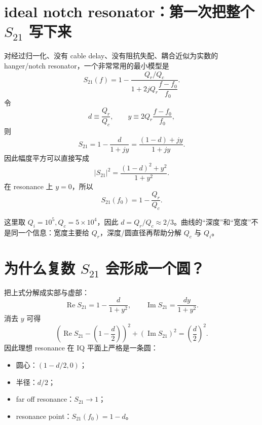 \documentclass[11pt,a4paper,openany]{ctexrep}
\begin{document}
\section{ideal notch resonator：第一次把整个 $S_{21}$ 写下来}

对经过归一化、没有 cable delay、没有阻抗失配、耦合近似为实数的 hanger/notch resonator，一个非常常用的最小模型是
\[
\boxed{
S_{21}(f)
=1-
\frac{Q_r/Q_c}
{1+2jQ_r\dfrac{f-f_0}{f_0}}.
}
\]
令
\[
d\equiv\frac{Q_r}{Q_c},
\qquad
y\equiv2Q_r\frac{f-f_0}{f_0},
\]
则
\[
S_{21}=1-\frac{d}{1+jy}
=\frac{(1-d)+jy}{1+jy}.
\]
因此幅度平方可以直接写成
\[
\boxed{
|S_{21}|^2=\frac{(1-d)^2+y^2}{1+y^2}.
}
\]
在 resonance 上 $y=0$，所以
\[
\boxed{
S_{21}(f_0)=1-\frac{Q_r}{Q_c}.
}
\]

\begin{center}
\end{center}

这里取 $Q_i=10^5,Q_c=5\times10^4$，因此 $d=Q_r/Q_c\approx2/3$。曲线的“深度”和“宽度”不是同一个信息：宽度主要给 $Q_r$，深度/圆直径再帮助分解 $Q_c$ 与 $Q_i$。

\section{为什么复数 $S_{21}$ 会形成一个圆？}

把上式分解成实部与虚部：
\[
\operatorname{Re}S_{21}=1-\frac{d}{1+y^2},
\qquad
\operatorname{Im}S_{21}=\frac{dy}{1+y^2}.
\]
消去 $y$ 可得
\[
\boxed{
\left(\operatorname{Re}S_{21}-\left(1-\frac d2\right)\right)^2
+
\left(\operatorname{Im}S_{21}\right)^2
=
\left(\frac d2\right)^2.
}
\]
因此理想 resonance 在 IQ 平面上严格是一条圆：
\begin{itemize}
  \item 圆心：$\left(1-d/2,0\right)$；
  \item 半径：$d/2$；
  \item far off resonance：$S_{21}\rightarrow1$；
  \item resonance point：$S_{21}(f_0)=1-d$。
\end{itemize}
\end{document}
